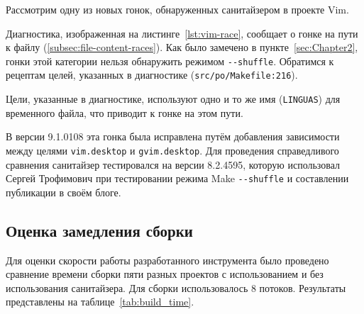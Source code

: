 Рассмотрим одну из новых гонок, обнаруженных санитайзером в проекте Vim.



Диагностика, изображенная на листинге~\ref{lst:vim-race}, сообщает о гонке на пути к файлу (\ref{subsec:file-content-races}). Как было замечено в пункте~\ref{sec:Chapter2}, гонки этой категории нельзя обнаружить режимом \texttt{-{}-shuffle}. Обратимся к рецептам целей, указанных в диагностике (\texttt{src/po/Makefile:216}).



Цели, указанные в диагностике, используют одно и то же имя (\texttt{LINGUAS}) для временного файла, что приводит к гонке на этом пути.

В версии 9.1.0108 эта гонка была исправлена путём добавления зависимости между целями \texttt{vim.desktop} и \texttt{gvim.desktop}. Для проведения справедливого сравнения санитайзер тестировался на версии 8.2.4595, которую использовал Сергей Трофимович при тестировании режима Make \texttt{-{}-shuffle} и составлении публикации в своём блоге.

\subsection{Оценка замедления сборки}

Для оценки скорости работы разработанного инструмента было проведено сравнение времени сборки пяти разных проектов с использованием и без использования санитайзера. Для сборки использовалось 8 потоков. Результаты представлены на таблице~\ref{tab:build_time}.

